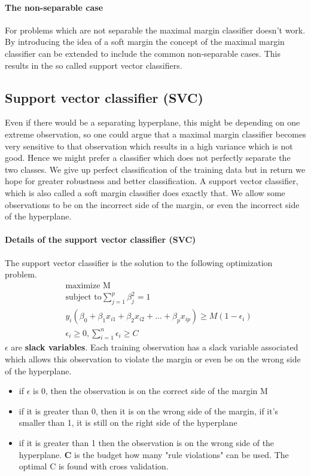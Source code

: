 \documentclass[../document.tex]{subfiles}
\begin{document}
	\paragraph{The non-separable case}
	For problems which are not separable the maximal margin classifier doesn't work. By introducing the idea of a soft margin the concept of the maximal margin classifier can be extended to include the common non-separable cases. This results in the so called support vector classifiers.

	\subsection{Support vector classifier (SVC)}
	Even if there would be a separating hyperplane, this might be depending on one extreme observation, so one could argue that a maximal margin classifier becomes very sensitive to that observation which results in a high variance which is not good. Hence we might prefer a classifier which does not perfectly separate the two classes. We give up perfect classification of the training data but in return we hope for greater robustness and better classification. A support vector classifier, which is also called a soft margin classifier does exactly that. We allow some observations to be on the incorrect side of the margin, or even the incorrect side of the hyperplane.

	\paragraph{Details of the support vector classifier (SVC)}
	The support vector classifier is the solution to the following optimization problem.
	\begin{equation}
	\begin{split}
		&\text{maximize M}\\
		&\text{subject to}\sum_{j=1}^{p}\beta_{j}^2=1\\
		&y_{i}(\beta_{0}+\beta_{1}x_{i1}+\beta_{2}x_{i2}+...+\beta_{p}x_{ip})\ge M(1-\epsilon_{i})\\
		&\epsilon_{i}\ge 0, \sum_{i=1}^{n}\epsilon_{i}\ge C
	\end{split}
	\end{equation}
	\(\epsilon\) are \textbf{slack variables}. Each training observation has a slack variable associated which allows this observation to violate the margin or even be on the wrong side of the hyperplane.
	\begin{itemize}
		\item if \(\epsilon\) is 0, then the observation is on the correct side of the margin M
		\item if it is greater than 0, then it is on the wrong side of the margin, if it's smaller than 1, it is still on the right side of the hyperplane
		\item if it is greater than 1 then the observation is on the wrong side of the hyperplane. \textbf{C} is the budget how many "rule violations" can be used. The optimal C is found with cross validation.
	\end{itemize}
\end{document}
